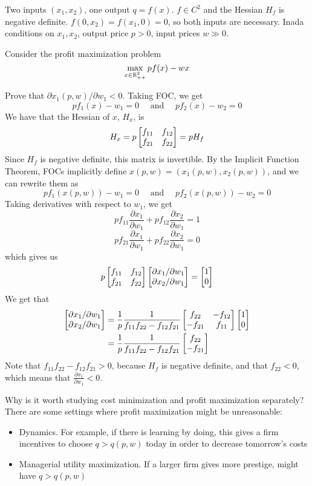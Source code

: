 \documentclass[12pt]{article}
\begin{document}
\begin{assumption}
	Two inputs $(x_1,x_2)$, one output $q = f(x)$. $f \in C^2$ and the Hessian $H_f$ is negative definite. $f(0,x_2) = f(x_1,0) = 0$, so both inputs are necessary. Inada conditions on $x_1,x_2$, output price $p > 0$, input prices $w \gg 0$.
\end{assumption}

Consider the profit maximization problem
\[
\max_{x \in \mathbb{R}^2_{++}} pf(x) - wx
\]

\begin{exercise}
	Prove that $\partial x_1(p,w) / \partial w_1 < 0$. Taking FOC, we get
	\[
	pf_1(x) - w_1 = 0 \quad \text{ and }\quad pf_2(x) - w_2 = 0
	\]
	We have that the Hessian of $x$, $H_x$, is 
	\[
	H_x = p \begin{bmatrix}f_{11} & f_{12} \\ f_{21} & f_{22}\end{bmatrix} = pH_f
	\]
	Since $H_f$ is negative definite, this matrix is invertible. By the Implicit Function Theorem, FOCs implicitly define $x(p,w) = (x_1(p,w), x_2(p,w))$, and we can rewrite them as
	\[
	pf_1(x(p,w)) - w_1 = 0 \quad \text{ and } \quad pf_2(x(p,w)) - w_2 = 0
	\]
	Taking derivatives with respect to $w_1$, we get
	\[
	pf_{11} \frac{\partial x_1}{\partial w_1} + p f_{12} \frac{\partial x_2}{\partial w_1} = 1
	\]
	\[
	pf_{21} \frac{\partial x_1}{\partial w_1} + p f_{22} \frac{\partial x_2}{\partial w_1} = 0
	\]
	which gives us
	\[
	p \begin{bmatrix}f_{11} & f_{12} \\ f_{21} & f_{22}\end{bmatrix} \begin{bmatrix}\partial x_1 / \partial w_1 \\ \partial x_2 / \partial w_1\end{bmatrix} = \begin{bmatrix}1 \\ 0\end{bmatrix}
	\]
	We get that
	\begin{align*}
	\begin{bmatrix}\partial x_1 / \partial w_1 \\ \partial x_2 / \partial w_1\end{bmatrix} &= \frac{1}{p} \frac{1}{f_{11}f_{22} - f_{12} f_{21}} \begin{bmatrix}f_{22} & -f_{12} \\ -f_{21} & f_{11}\end{bmatrix} \begin{bmatrix}1 \\ 0\end{bmatrix} \\
	&= \frac{1}{p} \frac{1}{f_{11}f_{22} - f_{12} f_{21}} \begin{bmatrix}f_{22} \\ -f_{21}\end{bmatrix}
	\end{align*}
	Note that $f_{11}f_{22} - f_{12}f_{21} > 0$, because $H_f$ is negative definite, and that $f_{22} < 0$, which means that $\frac{\partial x_1}{\partial w_1} < 0$.
\end{exercise}

\begin{question}
	Why is it worth studying cost minimization and profit maximization separately? There are some settings where profit maximization might be unreasonable:
	\begin{itemize}
		\item Dynamics. For example, if there is learning by doing, this gives a firm incentives to choose $q > q(p,w)$ today in order to decrease tomorrow's costs
		\item Managerial utility maximization. If a larger firm gives more prestige, might have $q > q(p,w)$
	\end{itemize}
\end{question}
\end{document}
